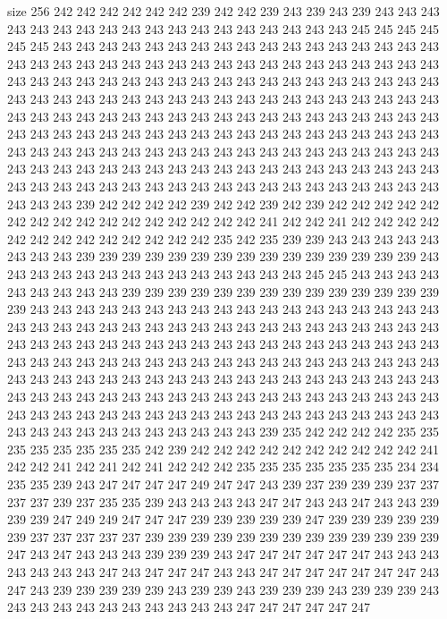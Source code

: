 size 256
242 242 242 242 242 242 239 242 242 239 243 239 243 239 243 243 243 243 243 243
243 243 243 243 243 243 243 243 243 243 243 243 245 245 245 245 245 245 243 243
243 243 243 243 243 243 243 243 243 243 243 243 243 243 243 243 243 243 243 243
243 243 243 243 243 243 243 243 243 243 243 243 243 243 243 243 243 243 243 243
243 243 243 243 243 243 243 243 243 243 243 243 243 243 243 243 243 243 243 243
243 243 243 243 243 243 243 243 243 243 243 243 243 243 243 243 243 243 243 243
243 243 243 243 243 243 243 243 243 243 243 243 243 243 243 243 243 243 243 243
243 243 243 243 243 243 243 243 243 243 243 243 243 243 243 243 243 243 243 243
243 243 243 243 243 243 243 243 243 243 243 243 243 243 243 243 243 243 243 243
243 243 243 243 243 243 243 243 243 243 243 243 243 243 243 243 243 243 243 243
243 243 243 243 243 243 243 243 243 243 239 242 242 242 242 239 242 242 239 242
239 242 242 242 242 242 242 242 242 242 242 242 242 242 242 242 242 241 242 242
241 242 242 242 242 242 242 242 242 242 242 242 242 242 235 242 235 239 239 243
243 243 243 243 243 243 243 239 239 239 239 239 239 239 239 239 239 239 239 239
239 239 243 243 243 243 243 243 243 243 243 243 243 243 243 243 245 245 243 243
243 243 243 243 243 243 243 239 239 239 239 239 239 239 239 239 239 239 239 239
239 239 243 243 243 243 243 243 243 243 243 243 243 243 243 243 243 243 243 243
243 243 243 243 243 243 243 243 243 243 243 243 243 243 243 243 243 243 243 243
243 243 243 243 243 243 243 243 243 243 243 243 243 243 243 243 243 243 243 243
243 243 243 243 243 243 243 243 243 243 243 243 243 243 243 243 243 243 243 243
243 243 243 243 243 243 243 243 243 243 243 243 243 243 243 243 243 243 243 243
243 243 243 243 243 243 243 243 243 243 243 243 243 243 243 243 243 243 243 243
243 243 243 243 243 243 243 243 243 243 243 243 243 243 243 243 243 243 243 243
243 243 243 243 243 239 235 242 242 242 242 235 235 235 235 235 235 235 235 242
239 242 242 242 242 242 242 242 242 242 242 241 242 242 241 242 241 242 241 242
242 242 235 235 235 235 235 235 235 234 234 235 235 239 243 247 247 247 247 249
247 247 243 239 237 239 239 239 237 237 237 237 239 237 235 235 239 243 243 243
243 247 247 243 243 247 243 243 239 239 239 247 249 249 247 247 247 239 239 239
239 239 247 239 239 239 239 239 239 237 237 237 237 237 239 239 239 239 239 239
239 239 239 239 239 239 239 247 243 247 243 243 243 239 239 239 243 247 247 247
247 247 247 243 243 243 243 243 243 243 247 243 247 247 247 243 243 247 247 247
247 247 247 247 243 247 243 239 239 239 239 239 243 239 239 243 239 239 239 243
239 239 239 243 243 243 243 243 243 243 243 243 243 243 247 247 247 247 247 247
